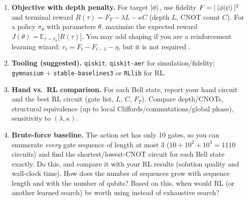\documentclass[11pt]{article}
\newcounter{problem}
\begin{document}
\begin{enumerate}[label=(\alph*)]
  Define the MDP for this problem: the state representation (e.g., the current two-qubit statevector, possibly with the step count), the action set \newline $\{X_0,X_1,Y_0,Y_1,Z_0,Z_1,H_0,H_1,\mathrm{CNOT}_{0\to1},\mathrm{CNOT}_{1\to0}\}$, the transition, and the termination (e.g., fidelity above a threshold or a maximum number of gates).
  \item \textbf{Objective with depth penalty.} For target $\ket{\phi}$, use fidelity $F=|\braket{\phi|\psi}|^2$ and terminal reward
  \(
  R(\tau)=F_T-\lambda L-\kappa C
  \)
  (depth $L$, CNOT count $C$). For a policy $\pi_\theta$ with parameters $\theta$, maximize the expected reward $J(\theta)=\mathbb{E}_{\tau\sim\pi_\theta}\big[R(\tau)\big]$. You may add shaping if you are a reinforcement learning wizard: $r_t=F_t-F_{t-1}-\eta$, but it is not required \smiley{}.
  \item \textbf{Tooling (suggested).} \texttt{qiskit}, \texttt{qiskit-aer} for simulation/fidelity; \texttt{gymnasium} + \texttt{stable-}\allowbreak\texttt{baselines3} or \texttt{RLlib} for RL.
  \item \textbf{Hand vs.\ RL comparison.} For each Bell state, report your hand circuit and the best RL circuit (gate list, $L$, $C$, $F_T$). Compare depth/CNOTs, structural equivalence (up to local Cliffords/commutations/global phase), sensitivity to $(\lambda,\kappa)$.
  \item \textbf{Brute-force baseline.} The action set has only 10 gates, so you can enumerate \emph{every} gate sequence of length at most 3 ($10+10^2+10^3=1110$ circuits) and find the shortest/lowest-CNOT circuit for each Bell state exactly. Do this, and compare it with your RL results (solution quality and wall-clock time). How does the number of sequences grow with sequence length and with the number of qubits? Based on this, when would RL (or another learned search) be worth using instead of exhaustive search?
\end{enumerate}
\end{document}
